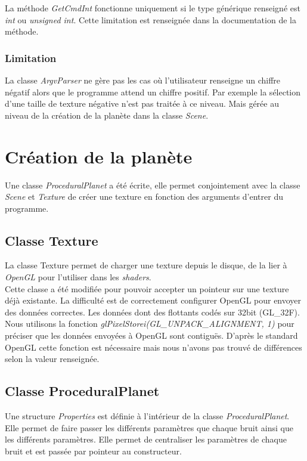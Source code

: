     La méthode \textit{GetCmdInt} fonctionne uniquement si le type générique renseigné est \textit{int} ou \textit{unsigned int}. Cette limitation est renseignée dans la documentation de la méthode.
    
  \subsubsection{Limitation}
    
    La classe \textit{ArgvParser} ne gère pas les cas où l'utilisateur renseigne un chiffre négatif alors que le programme attend un chiffre positif. Par exemple la sélection d'une taille de texture négative
    n'est pas traitée à ce niveau. Mais gérée au niveau de la création de la planète dans la classe \textit{Scene}.
  
  \section{Création de la planète}
  Une classe \textit{ProceduralPlanet} a été écrite, elle permet conjointement avec la classe \textit{Scene} et \textit{Texture} de créer une texture en fonction des arguments d'entrer du programme.
  
  \subsection{Classe Texture}
  \label{sec:class_texture}
  La classe Texture permet de charger une texture depuis le disque, de la lier à \textit{OpenGL} pour l'utiliser dans les \textit{shaders}.\\
  
  Cette classe a été modifiée pour pouvoir accepter un pointeur sur une texture déjà existante. 
  La difficulté est de correctement configurer OpenGL pour envoyer des données correctes. Les données dont des flottants codés sur 32bit (GL\_32F).\\
  Nous utilisons la fonction \textit{glPixelStorei(GL\_UNPACK\_ALIGNMENT, 1)} pour préciser que les données envoyées à OpenGL sont contiguës. D'après le standard OpenGL cette fonction est nécessaire mais 
  nous n'avons pas trouvé de différences selon la valeur renseignée.
  
  \subsection{Classe ProceduralPlanet}
    \label{sec::ProceduralPlanet}
  Une structure \textit{Properties} est définie à l'intérieur de la classe \textit{ProceduralPlanet}. Elle permet de faire passer les différents paramètres que chaque bruit ainsi que les différents paramètres. 
  Elle permet de centraliser les paramètres de chaque bruit et est passée par pointeur au constructeur.
  

